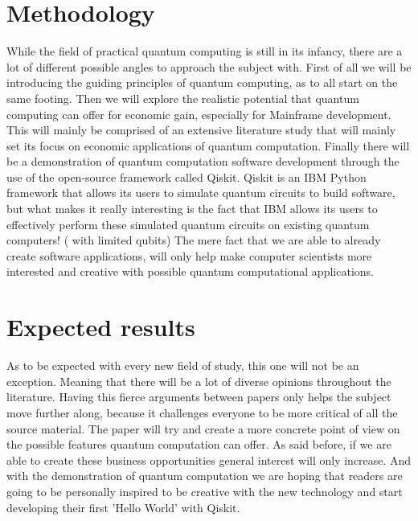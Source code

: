 \section{Methodology}
\label{sec:methodologie}

While the field of practical quantum computing is still in its infancy, there are a lot of different possible angles to approach the subject with. First of all we will be introducing the guiding principles of quantum computing, as to all start on the same footing. Then we will explore the realistic potential that quantum computing can offer for economic gain, especially for Mainframe development. This will mainly be comprised of an extensive literature study that will mainly set its focus on economic applications of quantum computation.
Finally there will be a demonstration of quantum computation software development through the use of the open-source framework called Qiskit. \autocite{Qiskit} Qiskit is an IBM Python framework that allows its users to simulate quantum circuits to build software, but what makes it really interesting is the fact that IBM allows its users to effectively perform these simulated quantum circuits on existing quantum computers! ( with limited qubits) The mere fact that we are able to already create software applications, will only help make computer scientists more interested and creative with possible quantum computational applications.

\section{Expected results}
\label{sec:verwachte_resultaten}

As to be expected with every new field of study, this one will not be an exception. Meaning that there will be a lot of diverse opinions throughout the literature. Having this fierce arguments between papers only helps the subject move further along, because it challenges everyone to be more critical of all the source material. The paper will try and create a more concrete point of view on the possible features quantum computation can offer. As said before, if we are able to create these business opportunities general interest will only increase. And with the demonstration of quantum computation we are hoping that readers are going to be personally inspired to be creative with the new technology and start developing their first 'Hello World' with Qiskit.

